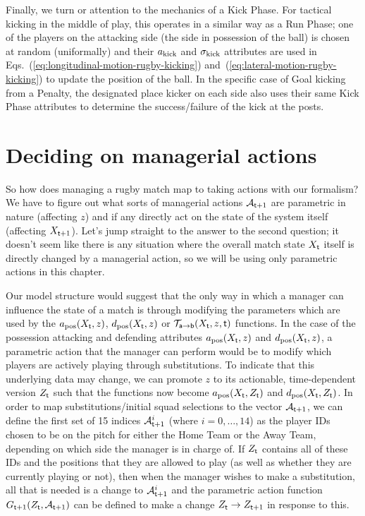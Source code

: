 Finally, we turn or attention to the mechanics of a {\sf Kick Phase}. For tactical kicking in the middle of play, this operates in a similar way as a {\sf Run Phase}; one of the players on the attacking side (the side in possession of the ball) is chosen at random (uniformally) and their $a_{\rm kick}$ and $\sigma_{\rm kick}$ attributes are used in Eqs.~(\ref{eq:longitudinal-motion-rugby-kicking}) and~(\ref{eq:lateral-motion-rugby-kicking}) to update the position of the ball. In the specific case of {\sf Goal} kicking from a {\sf Penalty}, the designated place kicker on each side also uses their same {\sf Kick Phase} attributes to determine the success/failure of the kick at the posts.

\section{\sffamily Deciding on managerial actions}

So how does managing a rugby match map to taking actions with our formalism? We have to figure out what sorts of managerial actions ${\cal A}_{{\sf t}+1}$ are parametric in nature (affecting $z$) and if any directly act on the state of the system itself (affecting $X_{{\sf t}+1}$). Let's jump straight to the answer to the second question; it doesn't seem like there is any situation where the overall match state $X_{\sf t}$ itself is directly changed by a managerial action, so we will be using only parametric actions in this chapter.

Our model structure would suggest that the only way in which a manager can influence the state of a match is through modifying the parameters which are used by the $a_{\rm pos}(X_{\sf t},z)$, $d_{\rm pos}(X_{\sf t},z)$ or ${\cal T}_{{\sf a}\rightarrow {\sf b}}(X_{\sf t},z,{\sf t})$ functions. In the case of the possession attacking and defending attributes $a_{\rm pos}(X_{\sf t},z)$ and $d_{\rm pos}(X_{\sf t},z)$, a parametric action that the manager can perform would be to modify which players are actively playing through substitutions. To indicate that this underlying data may change, we can promote $z$ to its actionable, time-dependent version $Z_{{\sf t}}$ such that the functions now become $a_{\rm pos}(X_{\sf t},Z_{\sf t})$ and $d_{\rm pos}(X_{\sf t},Z_{\sf t})$. In order to map substitutions/initial squad selections to the vector ${\cal A}_{{\sf t}+1}$, we can define the first set of 15 indices ${\cal A}_{{\sf t}+1}^i$ (where $i=0,\dots , 14$) as the player IDs chosen to be on the pitch for either the {\sf Home Team} or the {\sf Away Team}, depending on which side the manager is in charge of. If $Z_{\sf t}$ contains all of these IDs and the positions that they are allowed to play (as well as whether they are currently playing or not), then when the manager wishes to make a substitution, all that is needed is a change to ${\cal A}_{{\sf t}+1}^i$ and the parametric action function $G_{{\sf t}+1}(Z_{\sf t},{\cal A}_{{\sf t}+1})$ can be defined to make a change $Z_{\sf t}\rightarrow Z_{{\sf t}+1}$ in response to this.

